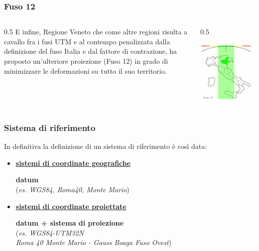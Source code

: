 \documentclass{beamer}
\begin{document}
{\begin{frame}
\frametitle{Fuso 12}
 \begin{columns}	
	\begin{column} {0.5\textwidth}
		E infine, Regione Veneto che come altre regioni risulta a cavallo fra i fusi UTM e al contempo penalizzata dalla definizione del fuso Italia e dal fattore di contrazione, ha proposto un’ulteriore proiezione (Fuso 12) in grado di minimizzare le deformazioni su tutto il suo territorio.
	\end{column}
\begin{column} {0.5\textwidth}
\begin{center}
	\includegraphics[width=1\textwidth] {./pics/proiezione2_F12.PNG}
\end{center}
\end{column}
\end{columns}
\end{frame}

\begin{frame}
   \frametitle{Sistema di riferimento}
   In definitiva la definizione di un sistema di riferimento è così data:
    \begin{itemize}
   		\item \underline{\textbf{sistemi di coordinate geografiche}}
		\begin{center}
			\textbf{datum}
			\\(\textit{es. WGS84, Roma40, Monte Mario})
		\end{center}
   		\item \underline{\textbf{sistemi di coordinate proiettate}}
 		\begin{center}
			\textbf{datum + sistema di proiezione}
			\\(\textit{es. WGS84-UTM32N \\ Roma 40 Monte Mario - Gauss Boaga Fuso Ovest})
		\end{center}  		
   	\end{itemize}
\end{frame}

}
\end{document}
